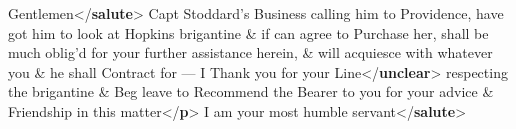 \begin{shaded}
\hspace*{1em}Gentlemen{</\textbf{salute}>}\mbox{}\newline 
{}\mbox{}\newline 
{}Capt Stoddard's Business\mbox{}\newline 
{}calling him to Providence, have\mbox{}\newline 
{}got him to look at Hopkins brigantine\mbox{}\newline 
{}\& if can agree to Purchase her, shall\mbox{}\newline 
{}be much oblig'd for your further\mbox{}\newline 
{}assistance herein, \& will acquiesce with\mbox{}\newline 
{}whatever you \& he shall Contract\mbox{}\newline 
{}for — I Thank you for your\mbox{}\newline 
{}\mbox{}\newline 
\hspace*{1em}Line{</\textbf{unclear}>} respecting the brigantine \& Beg\mbox{}\newline 
{}leave to Recommend the Bearer\mbox{}\newline 
{}to you for your advice \& Friendship\mbox{}\newline 
{}in this matter{</\textbf{p}>}\mbox{}\newline 
{}\mbox{}\newline 
\hspace*{1em}I am your most humble servant{</\textbf{salute}>}\mbox{}\newline 

\end{shaded}

